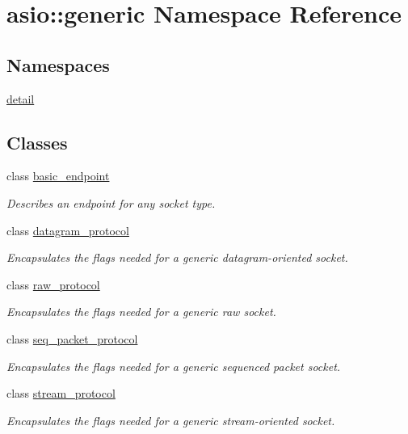 \hypertarget{namespaceasio_1_1generic}{}\section{asio\+:\+:generic Namespace Reference}
\label{namespaceasio_1_1generic}
\subsection*{Namespaces}
\begin{DoxyCompactItemize}
\item 
 \hyperlink{namespaceasio_1_1generic_1_1detail}{detail}
\end{DoxyCompactItemize}
\subsection*{Classes}
\begin{DoxyCompactItemize}
\item 
class \hyperlink{classasio_1_1generic_1_1basic__endpoint}{basic\+\_\+endpoint}
\begin{DoxyCompactList}\small\item\em Describes an endpoint for any socket type. \end{DoxyCompactList}\item 
class \hyperlink{classasio_1_1generic_1_1datagram__protocol}{datagram\+\_\+protocol}
\begin{DoxyCompactList}\small\item\em Encapsulates the flags needed for a generic datagram-\/oriented socket. \end{DoxyCompactList}\item 
class \hyperlink{classasio_1_1generic_1_1raw__protocol}{raw\+\_\+protocol}
\begin{DoxyCompactList}\small\item\em Encapsulates the flags needed for a generic raw socket. \end{DoxyCompactList}\item 
class \hyperlink{classasio_1_1generic_1_1seq__packet__protocol}{seq\+\_\+packet\+\_\+protocol}
\begin{DoxyCompactList}\small\item\em Encapsulates the flags needed for a generic sequenced packet socket. \end{DoxyCompactList}\item 
class \hyperlink{classasio_1_1generic_1_1stream__protocol}{stream\+\_\+protocol}
\begin{DoxyCompactList}\small\item\em Encapsulates the flags needed for a generic stream-\/oriented socket. \end{DoxyCompactList}\end{DoxyCompactItemize}
